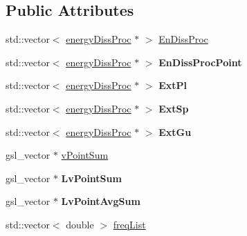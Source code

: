\subsection*{Public Attributes}
\begin{DoxyCompactItemize}
\item 
std\-::vector$<$ \hyperlink{classenergyDissProc}{energy\-Diss\-Proc} $\ast$ $>$ \hyperlink{classobserver_aeb5a8afa2221e268e06f74600acac7af}{En\-Diss\-Proc}
\item 
\hypertarget{classobserver_a18c7cc72d61f5610f8d56ec80c758251}{std\-::vector$<$ \hyperlink{classenergyDissProc}{energy\-Diss\-Proc} $\ast$ $>$ {\bfseries En\-Diss\-Proc\-Point}}\label{classobserver_a18c7cc72d61f5610f8d56ec80c758251}

\item 
\hypertarget{classobserver_ab825bcea700d3d9cb6dfba26edcda166}{std\-::vector$<$ \hyperlink{classenergyDissProc}{energy\-Diss\-Proc} $\ast$ $>$ {\bfseries Ext\-Pl}}\label{classobserver_ab825bcea700d3d9cb6dfba26edcda166}

\item 
\hypertarget{classobserver_a1d6a26b2cbfc866024c762525a048aaf}{std\-::vector$<$ \hyperlink{classenergyDissProc}{energy\-Diss\-Proc} $\ast$ $>$ {\bfseries Ext\-Sp}}\label{classobserver_a1d6a26b2cbfc866024c762525a048aaf}

\item 
\hypertarget{classobserver_ac69c17944b5eef96e875afc47f07f363}{std\-::vector$<$ \hyperlink{classenergyDissProc}{energy\-Diss\-Proc} $\ast$ $>$ {\bfseries Ext\-Gu}}\label{classobserver_ac69c17944b5eef96e875afc47f07f363}

\item 
gsl\-\_\-vector $\ast$ \hyperlink{classobserver_aef3c4770dc82fdb0d2ac7143e184cbc3}{v\-Point\-Sum}
\item 
\hypertarget{classobserver_a57f1a467bfc7855bec6b6ce971cc7c7e}{gsl\-\_\-vector $\ast$ {\bfseries Lv\-Point\-Sum}}\label{classobserver_a57f1a467bfc7855bec6b6ce971cc7c7e}

\item 
\hypertarget{classobserver_a1894b3a158640b8c93d6de5ce72cb775}{gsl\-\_\-vector $\ast$ {\bfseries Lv\-Point\-Avg\-Sum}}\label{classobserver_a1894b3a158640b8c93d6de5ce72cb775}

\item 
std\-::vector$<$ double $>$ \hyperlink{classobserver_a64f3e868a83ea1c693a329aba1f83560}{freq\-List}
\end{DoxyCompactItemize}



